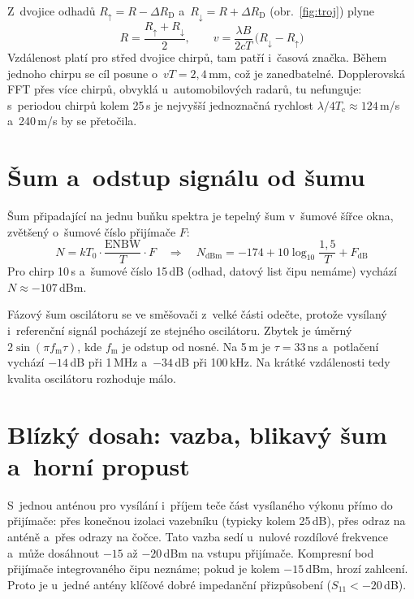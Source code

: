 \documentclass[czech]{skyren}
\begin{document}
Z~dvojice odhadů $R_\uparrow = R - \Delta R_\mathrm{D}$
a~$R_\downarrow = R + \Delta R_\mathrm{D}$ (obr.~\ref{fig:troj}) plyne
\[
R = \frac{R_\uparrow + R_\downarrow}{2}, \qquad
v = \frac{\lambda B}{2cT}\,\bigl(R_\downarrow - R_\uparrow\bigr)
\]
Vzdálenost platí pro střed dvojice chirpů, tam patří i~časová značka. Během
jednoho chirpu se cíl posune o~$vT = 2{,}4$\,mm, což je zanedbatelné.
Dopplerovská FFT přes více chirpů, obvyklá u~automobilových radarů, tu
nefunguje: s~periodou chirpů kolem 25\,\textmu s je nejvyšší jednoznačná
rychlost $\lambda/4T_\mathrm{c} \approx 124$\,m/s a~240\,m/s by se přetočila.

\section{Šum a~odstup signálu od šumu}

Šum připadající na jednu buňku spektra je tepelný šum v~šumové šířce okna,
zvětšený o~šumové číslo přijímače $F$:
\[
N = kT_0 \cdot \frac{\mathrm{ENBW}}{T} \cdot F
\quad\Rightarrow\quad
N_\mathrm{dBm} = -174 + 10\log_{10}\frac{1{,}5}{T} + F_\mathrm{dB}
\]
Pro chirp 10\,\textmu s a~šumové číslo 15\,dB (odhad, datový list čipu
nemáme) vychází \mbox{$N \approx -107$\,dBm}.

Fázový šum oscilátoru se ve směšovači z~velké části odečte, protože vysílaný
i~referenční signál pocházejí ze stejného oscilátoru. Zbytek je úměrný
$2\sin(\pi f_\mathrm{m}\tau)$, kde $f_\mathrm{m}$ je odstup od nosné. Na
5\,m je $\tau = 33$\,ns a~potlačení vychází $-14$\,dB při 1\,MHz a~$-34$\,dB
při 100\,kHz. Na krátké vzdálenosti tedy kvalita oscilátoru rozhoduje málo.

\section{Blízký dosah: vazba, blikavý šum a~horní propust}

S~jednou anténou pro vysílání i~příjem teče část vysílaného výkonu přímo do
přijímače: přes konečnou izolaci vazebníku (typicky kolem 25\,dB), přes odraz
na anténě a~přes odrazy na čočce. Tato vazba sedí u~nulové rozdílové
frekvence a~může dosáhnout $-15$ až $-20$\,dBm na vstupu přijímače.
Kompresní bod přijímače integrovaného čipu neznáme; pokud je kolem
$-15$\,dBm, hrozí zahlcení. Proto je u~jedné antény klíčové dobré
impedanční přizpůsobení ($S_{11} < -20$\,dB).
\end{document}
